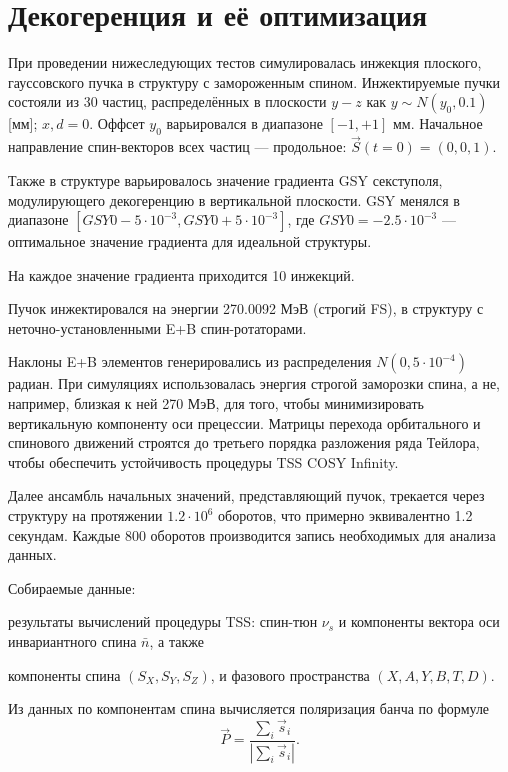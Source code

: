 \section{Декогеренция и её оптимизация}\label{sec:decoherence_simulations}
При проведении нижеследующих тестов симулировалась инжекция
плоского, гауссовского пучка в структуру с замороженным
спином. Инжектируемые пучки состояли из 30 частиц, распределённых в
плоскости $y-z$ как $y\sim N(y_0, 0.1)$ [мм]; $x,d =
0$. Оффсет $y_0$ варьировался в диапазоне $[-1, +1]$ мм. Начальное
направление спин-векторов всех частиц --- продольное: $\vec S(t=0) = (0,0,1)$.

Также в структуре варьировалось значение градиента GSY секступоля,
модулирующего декогеренцию в вертикальной плоскости. GSY менялся в
диапазоне $[GSY0 - 5\cdot10^{-3}, GSY0 + 5\cdot10^{-3}]$, где
$GSY0=-2.5\cdot 10^{-3}$ --- оптимальное значение градиента для идеальной структуры.

На каждое значение градиента приходится 10 инжекций.

Пучок инжектировался на энергии 270.0092 МэВ (строгий FS), в структуру
с неточно-установленными E+B спин-ротаторами. 

Наклоны E+B элементов
генерировались из распределения $N(0, 5\cdot10^{-4})$ радиан. При
симуляциях использовалась энергия строгой заморозки спина, а не,
например, близкая к ней 270 МэВ, для того, чтобы минимизировать
вертикальную компоненту оси прецессии. Матрицы перехода орбитального и спинового движений строятся до  третьего
порядка разложения ряда Тейлора, чтобы обеспечить устойчивость
процедуры TSS COSY Infinity.~\cite{COSYINF:BeamPhysMan}

Далее ансамбль начальных значений, представляющий пучок, трекается
через структуру на протяжении $1.2\cdot10^6$ оборотов, что
примерно эквивалентно 1.2 секундам. Каждые 800 оборотов производится
запись необходимых для анализа данных.

Собираемые данные: 
\begin{enumerate*}
	\item результаты вычислений процедуры TSS: спин-тюн $\nu_s$ и компоненты вектора оси инвариантного спина $\bar n$, а также
	\item компоненты спина $(S_X, S_Y, S_Z)$, и фазового пространства $(X,A,Y,B,T,D)$.
\end{enumerate*}

Из данных по компонентам спина вычисляется поляризация банча по
формуле
\begin{equation}\label{eq:polarization_formula}
\vec P = \frac{\sum_i\vec s_i}{|\sum_i\vec s_i|}.
\end{equation}

